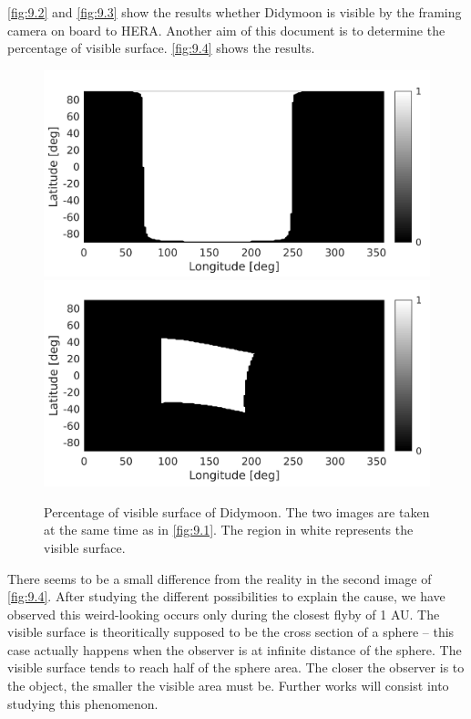 \autoref{fig:9.2} and \autoref{fig:9.3} show the results whether Didymoon is visible by the framing camera on board to HERA. Another aim of this document is to determine the percentage of visible surface. \autoref{fig:9.4} shows the results.

\begin{figure}[t]
    \includegraphics[width=0.49\linewidth]{rsc/areacov1.png}
    \includegraphics[width=0.49\linewidth]{rsc/areacov2.png}
    \caption{Percentage of visible surface of Didymoon. The two images are taken at the same time as in \autoref{fig:9.1}. The region in white represents the visible surface.}
    \label{fig:9.4}
\end{figure}

There seems to be a small difference from the reality in the second image of \autoref{fig:9.4}. After studying the different possibilities to explain the cause, we have observed this weird-looking occurs only during the closest flyby of 1 \si{AU}. The visible surface is theoritically supposed to be the cross section of a sphere -- this case actually happens when the observer is at infinite distance of the sphere. The visible surface tends to reach half of the sphere area. The closer the observer is to the object, the smaller the visible area must be. Further works will consist into studying this phenomenon.
